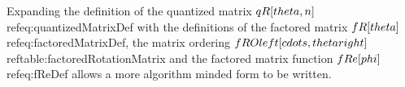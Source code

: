 Expanding the definition of the quantized matrix $\\qR[\\theta, n]$ \\ref{eq:quantizedMatrixDef} with the definitions of the factored matrix $\\fR[\\theta] $ \\ref{eq:factoredMatrixDef}, the matrix ordering $ \\fRO \\left[ \\cdots , \\theta \\right] $ \\ref{table:factoredRotationMatrix} and the factored matrix function $\\fRe[\\phi]$ \\ref{eq:fReDef} allows a more algorithm minded form to be written.


